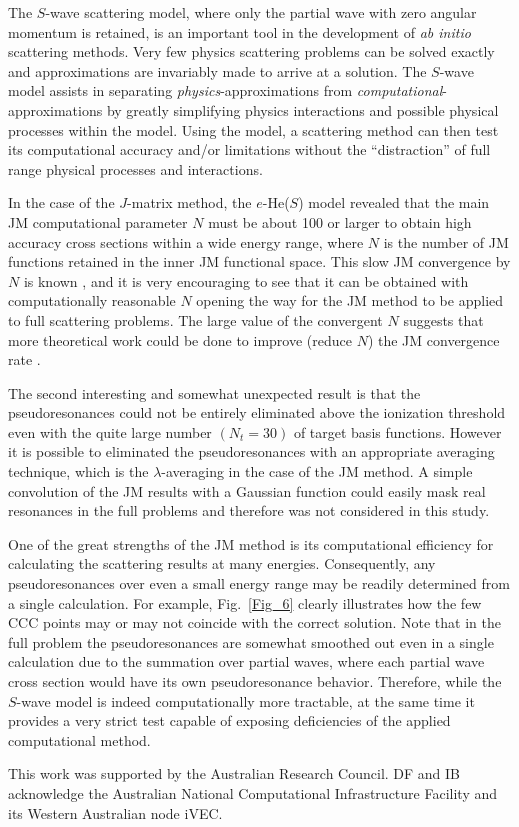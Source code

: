 \documentclass[aip
, pra
, showpacs
, aps
, twocolumn
, groupedaddress
, floatfix
]{revtex4}
\begin{document}
The $S$-wave scattering model, where only the partial wave with zero angular momentum is retained,
is an important tool in the development of {\em ab initio} scattering methods.
Very few physics scattering problems can be solved exactly and approximations are invariably made to arrive at a solution.
The $S$-wave model assists in separating {\em physics}-approximations from {\em computational}-approximations by
greatly simplifying physics interactions and possible physical processes within the model.
Using the model, a scattering method can then test its computational accuracy
and/or limitations without the ``distraction'' of full range physical processes and interactions.


In the case of the $J$-matrix method, the $e$-He($S$) model revealed that the main JM computational parameter
$N$ must be about 100 or larger to obtain high accuracy cross sections within a wide energy range,
where $N$ is the number of JM functions retained in the inner JM functional space.
This slow JM convergence by $N$ is known \cite{HY74p1209},
and it is very encouraging to see that it can be obtained with computationally reasonable $N$
opening the way for the JM method to be applied to full scattering problems.
The large value of the convergent $N$ suggests that more theoretical work could be done to
improve (reduce $N$) the JM convergence rate \cite{VBA02p010404}.


The second interesting and somewhat unexpected result is that the pseudoresonances could not be entirely eliminated
above the ionization threshold even with the quite large number $(N_t=30)$ of target basis functions.
However it is possible to eliminated the pseudoresonances with an appropriate averaging technique, which is the $\lambda$-averaging in the case of the JM method.
A simple convolution of the JM results with a Gaussian function could easily mask real resonances in the full problems
and therefore was not considered in this study.


One of the great strengths of the JM method is its computational efficiency for calculating the scattering results at many energies.
Consequently, any pseudoresonances over even a small energy range may be readily determined from a single calculation. For example,
Fig.~\ref{Fig_6} clearly illustrates how the few CCC points may or may not coincide with the correct solution.
Note that in the full problem the pseudoresonances are somewhat smoothed out
even in a single calculation due to
the summation over partial waves, where each partial wave cross section would have its own pseudoresonance behavior.
Therefore, while the $S$-wave model is indeed computationally more tractable, at the same time it provides a very strict test
capable of exposing deficiencies of the applied computational method.



\begin{acknowledgments}
This work was supported by the Australian Research Council. DF and IB
acknowledge the Australian National Computational Infrastructure
Facility and its Western Australian node iVEC.
\end{acknowledgments}





\end{document}
